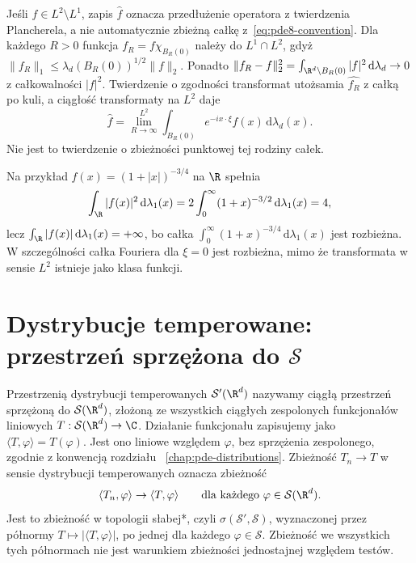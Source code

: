 \begin{uwaga}
Jeśli $f\in L^2\setminus L^1$, zapis $\widehat f$
oznacza przedłużenie operatora z twierdzenia
Plancherela, a nie automatycznie zbieżną całkę
z~\eqref{eq:pde8-convention}.
Dla każdego $R>0$ funkcja
$f_R=f\chi_{B_R(0)}$ należy do $L^1\cap L^2$,
gdyż $\|f_R\|_1\le
\lambda_d(B_R(0))^{1/2}\|f\|_2$.
Ponadto $\|f_R-f\|_2^2
=\int_{\R^d\setminus B_R(0)}|f|^2\,\mathrm d\lambda_d
\to0$ z całkowalności $|f|^2$.
Twierdzenie o zgodności transformat
utożsamia $\widehat{f_R}$ z całką po kuli,
a ciągłość transformaty na $L^2$ daje
\[
 \widehat f
 =\lim_{R\to\infty}^{L^2}
 \int_{B_R(0)} e^{-ix\cdot\xi}f(x)
 \,\mathrm d\lambda_d(x).
\]
Nie jest to twierdzenie o zbieżności punktowej
tej rodziny całek.

Na przykład $f(x)=(1+|x|)^{-3/4}$ na $\R$ spełnia
\[
 \int_\R |f(x)|^2\,\mathrm d\lambda_1(x)
 =2\int_0^\infty(1+x)^{-3/2}\,\mathrm d\lambda_1(x)=4,
\]
lecz $\int_\R |f(x)|\,\mathrm d\lambda_1(x)=+\infty$,
bo całka $\int_0^\infty(1+x)^{-3/4}\,\mathrm d\lambda_1(x)$
jest rozbieżna. W szczególności całka Fouriera
dla $\xi=0$ jest rozbieżna, mimo że transformata
w sensie $L^2$ istnieje jako klasa funkcji.
\end{uwaga}

\section[Dystrybucje temperowane]{Dystrybucje temperowane: przestrzeń sprzężona do $\mathcal S$}
\label{sec:pde8-tempered}

\begin{definicja}
\label{def:pde8-tempered}
Przestrzenią dystrybucji temperowanych $\mathcal S'(\R^d)$
nazywamy ciągłą przestrzeń sprzężoną do $\mathcal S(\R^d)$,
złożoną ze wszystkich ciągłych zespolonych funkcjonałów
liniowych $T:\mathcal S(\R^d)\to\C$.
Działanie funkcjonału zapisujemy jako
$\langle T,\varphi\rangle=T(\varphi)$.
Jest ono liniowe względem $\varphi$, bez sprzężenia
zespolonego, zgodnie z konwencją rozdziału
~\ref{chap:pde-distributions}.
Zbieżność $T_n\to T$ w sensie dystrybucji temperowanych
oznacza zbieżność
\[
 \langle T_n,\varphi\rangle\to\langle T,\varphi\rangle
 \qquad\text{dla każdego }\varphi\in\mathcal S(\R^d).
\]
Jest to zbieżność w topologii słabej*,
czyli $\sigma(\mathcal S',\mathcal S)$, wyznaczonej
przez półnormy $T\mapsto|\langle T,\varphi\rangle|$,
po jednej dla każdego $\varphi\in\mathcal S$.
Zbieżność we wszystkich tych półnormach nie jest
warunkiem zbieżności jednostajnej względem testów.
\end{definicja}

